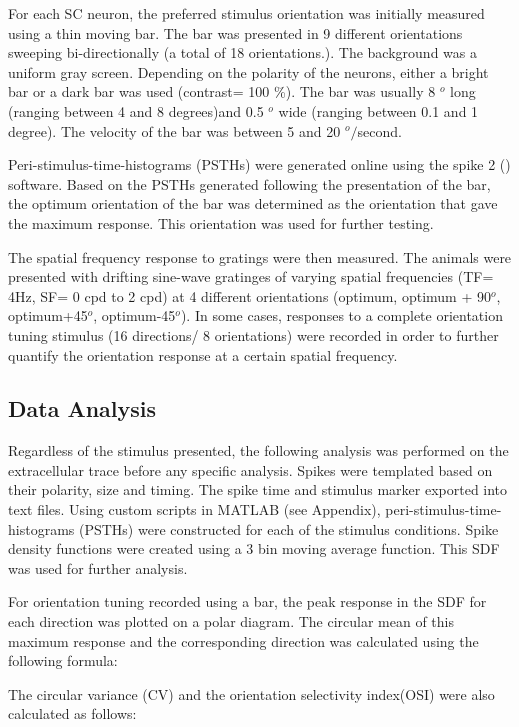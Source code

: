 \documentclass [12pt]{report}
\begin{document}
For each SC neuron, the preferred stimulus orientation was initially measured using a thin moving bar. The bar was presented in 9 different orientations sweeping bi-directionally (a total of 18 orientations.). The background was a uniform gray screen. Depending on the polarity of the neurons, either a bright bar or a dark bar was used (contrast= 100 \%). The bar was usually 8 $^{o}$ long (ranging between 4 and 8 degrees)and 0.5 $^{o}$ wide (ranging between 0.1 and 1 degree). The velocity of the bar was between 5 and 20 $^{o}/$second.

Peri-stimulus-time-histograms (PSTHs) were generated online using the spike 2 () software. Based on the PSTHs generated following the presentation of the bar, the optimum orientation of the bar was determined as the orientation that gave the maximum response. This orientation was used for further testing.

The spatial frequency response to gratings were then measured. The animals were presented with drifting sine-wave gratinges of varying spatial frequencies (TF= 4Hz, SF= 0 cpd to 2 cpd) at 4 different orientations (optimum, optimum + 90$^{o}$, optimum+45$^{o}$, optimum-45$^{o}$). In some cases, responses to a complete orientation tuning stimulus (16 directions/ 8 orientations) were recorded in order to further quantify the orientation response at a certain spatial frequency.

\subsection{Data Analysis}

Regardless of the stimulus presented, the following analysis was performed on the extracellular trace before any specific analysis. Spikes were templated based on their polarity, size and timing. The spike time and stimulus marker exported into text files. Using custom scripts in MATLAB (see Appendix), peri-stimulus-time-histograms (PSTHs) were constructed for each of the stimulus conditions. Spike density functions were created using a 3 bin moving average function. This SDF was used for further analysis.

For orientation tuning recorded using a bar, the peak response in the SDF for each direction was plotted on a polar diagram. The circular mean of this maximum response and the corresponding direction was calculated using the following formula:


The circular variance (CV) and the orientation selectivity index(OSI) were also calculated as follows:
\end{document}

